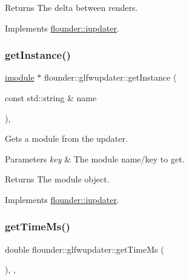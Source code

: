 \begin{DoxyReturn}{Returns}
The delta between renders. 
\end{DoxyReturn}


Implements \hyperlink{classflounder_1_1iupdater_a00d7cf530cfbd7f83c8903328da14027}{flounder\+::iupdater}.

\mbox{\label{classflounder_1_1glfwupdater_a284945635b93ffc1bd6164ff20565349}} 
\subsubsection{\texorpdfstring{get\+Instance()}{getInstance()}}
{\footnotesize\ttfamily \hyperlink{classflounder_1_1imodule}{imodule} $\ast$ flounder\+::glfwupdater\+::get\+Instance (\begin{DoxyParamCaption}\item[{const std\+::string \&}]{name }\end{DoxyParamCaption})\hspace{0.3cm}{\ttfamily [override]}, {\ttfamily [virtual]}}



Gets a module from the updater. 


\begin{DoxyParams}{Parameters}
{\em key} & The module name/key to get. \\
\hline
\end{DoxyParams}
\begin{DoxyReturn}{Returns}
The module object. 
\end{DoxyReturn}


Implements \hyperlink{classflounder_1_1iupdater_a391b1788b5c139b199ed48033da1b88d}{flounder\+::iupdater}.

\mbox{\label{classflounder_1_1glfwupdater_a1c3b884efb6e785143db556d4db9bdc8}} 
\subsubsection{\texorpdfstring{get\+Time\+Ms()}{getTimeMs()}}
{\footnotesize\ttfamily double flounder\+::glfwupdater\+::get\+Time\+Ms (\begin{DoxyParamCaption}{ }\end{DoxyParamCaption})\hspace{0.3cm}{\ttfamily [inline]}, {\ttfamily [override]}, {\ttfamily [virtual]}}



